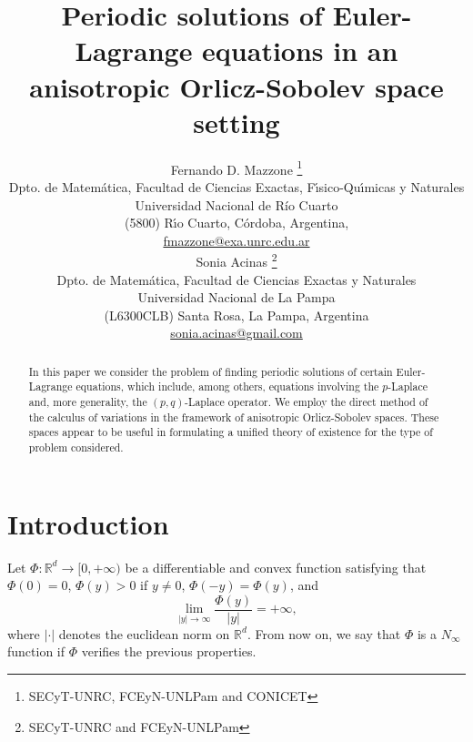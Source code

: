 \documentclass[twoside]{article}
\title{Periodic solutions of
Euler-Lagrange equations in an anisotropic Orlicz-Sobolev space setting  }
\author{
 Fernando D. Mazzone \thanks{SECyT-UNRC, FCEyN-UNLPam and CONICET}\\
Dpto. de Matem\'atica, Facultad de Ciencias Exactas, F\'{\i}sico-Qu\'{\i}micas y Naturales\\
Universidad Nacional de R\'{i}o Cuarto\\
(5800) R\'{\i}o Cuarto, C\'ordoba, Argentina,\\
\url{fmazzone@exa.unrc.edu.ar} \\
Sonia Acinas \thanks{SECyT-UNRC and  FCEyN-UNLPam}\\
Dpto. de Matem\'atica, Facultad de Ciencias Exactas y Naturales\\
Universidad Nacional de La Pampa\\
(L6300CLB) Santa Rosa, La Pampa, Argentina\\
\url{sonia.acinas@gmail.com}\\[3mm]
}
\date{}
\theoremstyle{remark}
\newcommand{\rr}{\mathbb{R}}
\begin{document}
\maketitle
%
\begingroup%
    \renewcommand{\thefootnote}{}%
    \endgroup
%
%
%
%

\begin{abstract}
In this paper we consider the problem of finding periodic solutions of certain Euler-Lagrange equations, which include, among others, equations involving the $p$-Laplace and, more generality, the $(p,q)$-Laplace operator. We employ the direct method of the calculus of variations in the framework of anisotropic Orlicz-Sobolev spaces. These spaces appear to be useful in formulating a unified theory of existence for the type of problem considered.
\end{abstract}






\pagestyle{fancy} \headheight 35pt \fancyhead{} \fancyfoot{}

\fancyfoot[C]{\thepage}  \fancyhead[CO]{\nouppercase{\section}}

\fancyhead[CO]{\nouppercase{\leftmark}}






\section{Introduction}

Let $\Phi:\mathbb{R}^d\to [0,+\infty)$ be  a differentiable and convex function satisfying that $\Phi(0)=0$, $\Phi(y)>0$ if $y\neq 0$, $\Phi(-y)=\Phi(y)$,
 and
\begin{equation}\label{eq:N-sub-inf}
\lim_{|y|\to\infty}\frac{\Phi(y)}{|y|}=+\infty,
\end{equation}
where $|\cdot|$ denotes the euclidean norm on $\rr^d$. From now on, we say that $\Phi$ is a $N_{\infty}$ function if $\Phi$ verifies the previous properties.
\end{document}

